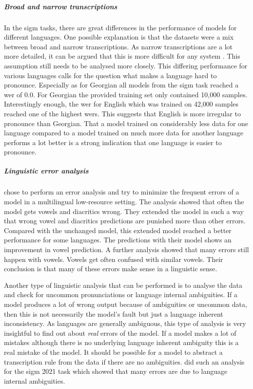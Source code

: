 \subparagraph{Broad and narrow transcriptions}
In the \ac{sigm} tasks, there are great differences in the performance of models for different languages. One possible explanation is that the datasets were a mix between broad and narrow transcriptions. As narrow transcriptions are a lot more detailed, it can be argued that this is more difficult for any system \citep{Ashby-Bartley.2021}. This assumption still needs to be analysed more closely. This differing performance for various languages calls for the question what makes a language hard to pronounce. Especially as for Georgian all models from the \ac{sigm} task reached a \ac{wer} of $0.0$. For Georgian the provided training set only contained 10,000 samples. Interestingly enough, the \ac{wer} for English which was trained on 42,000 samples reached one of the highest \acp{wer}. This suggests that English is more irregular to pronounce than Georgian. That a model trained on considerably less data for one language compared to a model trained on much more data for another language performs a lot better is a strong indication that one language is easier to pronounce.

\subparagraph{Linguistic error analysis} \citet{lo-nicolai-2021-linguistic} chose to perform an error analysis and try to minimize the frequent errors of a model in a multilingual low-resource setting. The analysis showed that often the model gets vowels and diacritics wrong. They extended the model in such a way that wrong vowel and diacritics predictions are punished more than other errors. Compared with the unchanged model, this extended model reached a better performance for some languages. The predictions with their model shows an improvement in vowel prediction. A further analysis showed that many errors still happen with vowels. Vowels get often confused with similar vowels. Their conclusion is that many of these errors make sense in a linguistic sense. 

Another type of linguistic analysis that can be performed is to analyse the data and check for uncommon pronunciations or language internal ambiguities. If a model produces a lot of wrong output because of ambiguities or uncommon data, then this is not necessarily the model's fault but just a language inherent inconsistency. As languages are generally ambiguous, this type of analysis is very insightful to find out about \textit{real} errors of the model. If a model makes a lot of mistakes although there is no underlying language inherent ambiguity this is a real mistake of the model. It should be possible for a model to abstract a transcription rule from the data if there are no ambiguities. \cite{Ashby-Bartley.2021} did such an analysis for the \ac{sigm} 2021 task which showed that many errors are due to language internal ambiguities.


